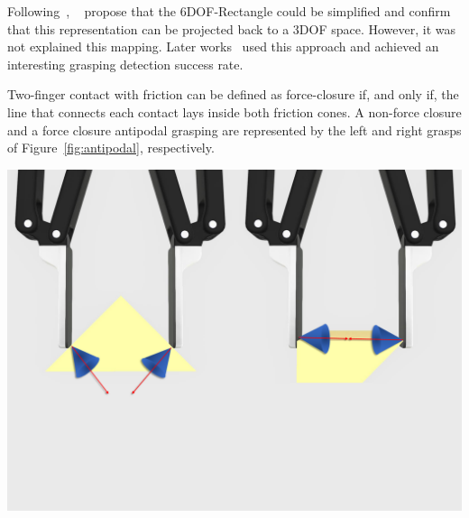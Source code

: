 Following~\cite{Jiang2011a}, \citeauthor{Lenz2015}~\cite{Lenz2015} propose that the 6DOF-Rectangle could be simplified and confirm that this representation can be projected back to a 3DOF space. However, it was not explained this mapping. Later works~\cite{Redmon2015,Watson2017,Gariepy2019,asif2018ensemblenet} used this approach and achieved an interesting grasping detection success rate. 

\begin{tcolorbox}[every float=\centering, drop shadow, title= Antipodal Grasping]

 Two-finger contact with friction can be defined as force-closure if, and only if,  the line that connects each contact lays inside both friction cones. A non-force closure and a force closure antipodal grasping are represented by the left and right grasps of Figure~\ref{fig:antipodal}, respectively.

\vspace*{1ex}

\centerline{\includegraphics[trim={0cm 10cm 0cm 0cm},clip,width=.5\linewidth,angle=0]{Cap2/Figuras/antipodal_2.pdf}}
\label{fig:antipodal}
\end{tcolorbox}


